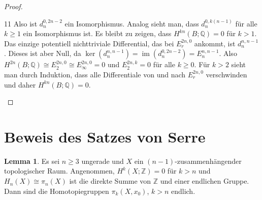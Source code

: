 \documentclass[11pt, a4paper, german]{article}
\theoremstyle{definition}
\newtheorem{lem}{Lemma}
\theoremstyle{remark}
\newcommand{\Z}{\mathbb{Z}} %
\newcommand{\Q}{\mathbb{Q}} %
\DeclareMathOperator{\im}{im} %
\begin{document}
\begin{proof}
\begin{cutout}{0}{0pt}{\dimexpr\linewidth-5.5cm\relax}{11}
    Also ist $d_n^{0,2n-2}$ ein Isomorphismus.
    Analog sieht man, dass $d_n^{0,k(n-1)}$ für alle $k \geq 1$ ein Isomorphismus ist.
    Es bleibt zu zeigen, dass $H^{kn}(B; \Q) = 0$ für $k > 1$.
    Das einzige potentiell nichttriviale Differential, das bei $E_r^{2n,0}$ ankommt, ist $d_n^{n,n-1}$.
    Dieses ist aber Null, da $\ker(d_n^{n,n-1}) = \im(d_n^{0,2n-2}) = E_n^{n,n-1}$.
    Also $H^{2n}(B; \Q) \cong E_2^{2n,0} \cong E_\infty^{2n,0} = 0$ und $E_2^{2n,k} = 0$ für alle $k \geq 0$.
    Für $k > 2$ sieht man durch Induktion, dass alle Differentiale von und nach $E_r^{2n,0}$ verschwinden und daher $H^{kn}(B; \Q) = 0$. \qedhere
  \end{cutout}
\end{proof}

\section{Beweis des Satzes von Serre}

\begin{lem}
  Es sei $n \geq 3$ ungerade und $X$ ein $(n{-}1)$-zusammenhängender topologischer Raum.
  Angenommen, $H^k(X; \Z) = 0$ für $k > n$ und $H_n(X) \cong \pi_n(X)$ ist die direkte Summe von $\Z$ und einer endlichen Gruppe.
  Dann sind die Homotopiegruppen $\pi_k(X, x_0)$, $k > n$ endlich.
\end{lem}
\end{document}
